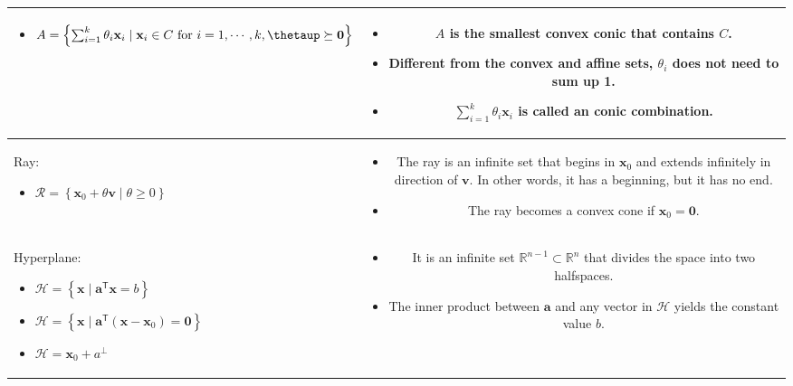 \documentclass{article}
\newcommand{\trans}{\mathsf{T}}
\begin{document}
\begin{xltabular}{\textwidth}{|A|C|}
\begin{itemize}[leftmargin=*]
		\item $A = \left\{ \sum_{i=1}^{k} \theta_i\mathbf{x}_i \mid \mathbf{x}_i \in C  \textnormal{ for } i=1,\cdots, k, \boldsymbol{\thetaup} \succeq \mathbf{0} \right\}$
	\end{itemize} & \vspace{-3.5ex}
	\begin{itemize}[leftmargin=*]
		\item $A$ is the smallest convex conic that contains $C$.
		\item Different from the convex and affine sets, \(\theta_i\) does not need to sum up 1.
		\item \(\sum_{i=1}^{k} \theta_i\mathbf{x}_i\) is called an conic combination.
	\end{itemize}\\
	\hline
	Ray:
	\begin{itemize}[leftmargin=*]
		\item \(\mathcal{R} = \left\{ \mathbf{x}_0 + \theta \mathbf{v} \mid \theta \geq 0 \right\}\)
	\end{itemize} & \vspace{-3.5ex} \begin{itemize}[leftmargin=*]
		\item The ray is an infinite set that begins in \(\mathbf{x}_0\) and extends infinitely in direction of \(\mathbf{v}\). In other words, it has a beginning, but it has no end.
		\item The ray becomes a convex cone if \(\mathbf{x}_0 = \mathbf{0}.\)
	\end{itemize} \\
	\hline
	Hyperplane:
	\begin{itemize}[leftmargin=*]
		\item \( \mathcal{H} = \left\{ \mathbf{x} \mid \mathbf{a}^\trans \mathbf{x} = b \right\}\)
		\item \(\mathcal{H} = \left\{ \mathbf{x} \mid \mathbf{a}^\trans (\mathbf{x} - \mathbf{x}_{0}) = \mathbf{0} \right\}\)
		\item \(\mathcal{H} = \mathbf{x}_0 + a^{\perp} \)
	\end{itemize} & \vspace{-3.5ex}
	\begin{itemize}[leftmargin=*]
		\item It is an infinite set \(\mathbb{R}^{n-1} \subset \mathbb{R}^{n}\) that divides the space into two halfspaces.
		\item The inner product between \(\mathbf{a}\) and any vector in \(\mathcal{H}\) yields the constant value \(b\).

\end{itemize}
\end{xltabular}
\end{document}
